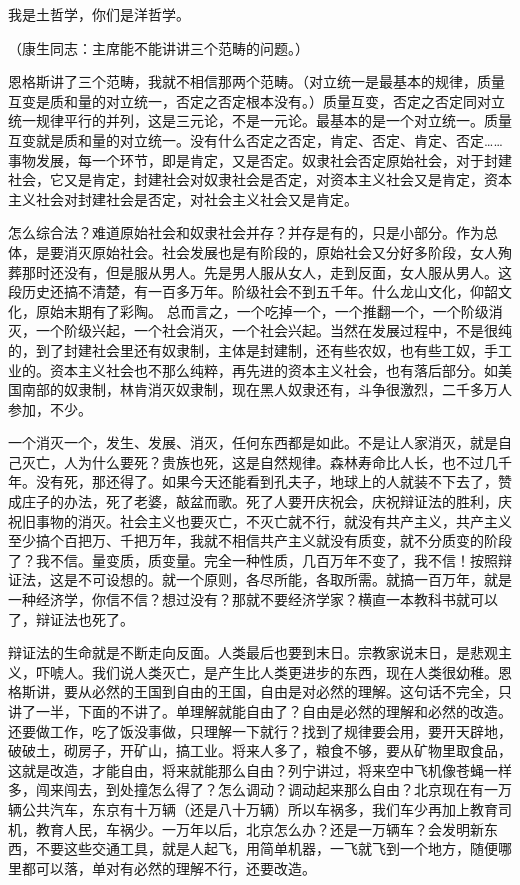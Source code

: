我是土哲学，你们是洋哲学。

（康生同志：主席能不能讲讲三个范畴的问题。）

恩格斯讲了三个范畴，我就不相信那两个范畴。（对立统一是最基本的规律，质量互变是质和量的对立统一，否定之否定根本没有。）质量互变，否定之否定同对立统一规律平行的并列，这是三元论，不是一元论。最基本的是一个对立统一。质量互变就是质和量的对立统一。没有什么否定之否定，肯定、否定、肯定、否定……事物发展，每一个环节，即是肯定，又是否定。奴隶社会否定原始社会，对于封建社会，它又是肯定，封建社会对奴隶社会是否定，对资本主义社会又是肯定，资本主义社会对封建社会是否定，对社会主义社会又是肯定。

怎么综合法？难道原始社会和奴隶社会并存？并存是有的，只是小部分。作为总体，是要消灭原始社会。社会发展也是有阶段的，原始社会又分好多阶段，女人殉葬那时还没有，但是服从男人。先是男人服从女人，走到反面，女人服从男人。这段历史还搞不清楚，有一百多万年。阶级社会不到五千年。什么龙山文化，仰韶文化，原始末期有了彩陶。 总而言之，一个吃掉一个，一个推翻一个，一个阶级消灭，一个阶级兴起，一个社会消灭，一个社会兴起。当然在发展过程中，不是很纯的，到了封建社会里还有奴隶制，主体是封建制，还有些农奴，也有些工奴，手工业的。资本主义社会也不那么纯粹，再先进的资本主义社会，也有落后部分。如美国南部的奴隶制，林肯消灭奴隶制，现在黑人奴隶还有，斗争很激烈，二千多万人参加，不少。

一个消灭一个，发生、发展、消灭，任何东西都是如此。不是让人家消灭，就是自己灭亡，人为什么要死？贵族也死，这是自然规律。森林寿命比人长，也不过几千年。没有死，那还得了。如果今天还能看到孔夫子，地球上的人就装不下去了，赞成庄子的办法，死了老婆，敲盆而歌。死了人要开庆祝会，庆祝辩证法的胜利，庆祝旧事物的消灭。社会主义也要灭亡，不灭亡就不行，就没有共产主义，共产主义至少搞个百把万、千把万年，我就不相信共产主义就没有质变，就不分质变的阶段了？我不信。量变质，质变量。完全一种性质，几百万年不变了，我不信！按照辩证法，这是不可设想的。就一个原则，各尽所能，各取所需。就搞一百万年，就是一种经济学，你信不信？想过没有？那就不要经济学家？横直一本教科书就可以了，辩证法也死了。

辩证法的生命就是不断走向反面。人类最后也要到末日。宗教家说末日，是悲观主义，吓唬人。我们说人类灭亡，是产生比人类更进步的东西，现在人类很幼稚。恩格斯讲，要从必然的王国到自由的王国，自由是对必然的理解。这句话不完全，只讲了一半，下面的不讲了。单理解就能自由了？自由是必然的理解和必然的改造。还要做工作，吃了饭没事做，只理解一下就行？找到了规律要会用，要开天辟地，破破土，砌房子，开矿山，搞工业。将来人多了，粮食不够，要从矿物里取食品，这就是改造，才能自由，将来就能那么自由？列宁讲过，将来空中飞机像苍蝇一样多，闯来闯去，到处撞怎么得了？怎么调动？调动起来那么自由？北京现在有一万辆公共汽车，东京有十万辆（还是八十万辆）所以车祸多，我们车少再加上教育司机，教育人民，车祸少。一万年以后，北京怎么办？还是一万辆车？会发明新东西，不要这些交通工具，就是人起飞，用简单机器，一飞就飞到一个地方，随便哪里都可以落，单对有必然的理解不行，还要改造。

